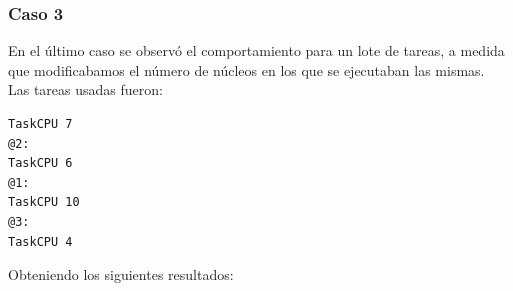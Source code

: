 \documentclass[a4paper]{article}
\begin{document}
% 
% 
% 
% 
% 
 
 \bigskip
 
 \subsubsection*{Caso 3}\label{caso3}
 
 En el último caso se observó el comportamiento para un lote  de tareas, a medida que modificabamos el número de núcleos en los que se ejecutaban las mismas.\\
 
 Las tareas usadas fueron:
 \begin{codesnippet}
	\begin{verbatim}
TaskCPU 7
@2:
TaskCPU 6
@1:
TaskCPU 10
@3:
TaskCPU 4
	\end{verbatim}
	\end{codesnippet}

	
	Obteniendo los siguientes resultados:\\
\end{document}
